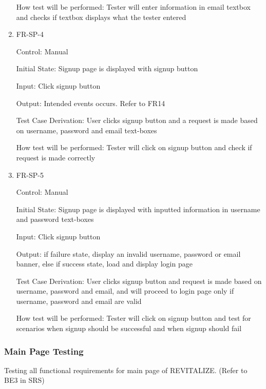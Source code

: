 \documentclass[12pt, titlepage]{article}
\begin{document}
\begin{enumerate}
How test will be performed: Tester will enter information in email textbox and checks if textbox displays what the tester entered

\item{FR-SP-4\\}

Control: Manual
					
Initial State: Signup page is displayed with signup button
					
Input: Click signup button
					
Output: Intended events occurs. Refer to FR14

Test Case Derivation: User clicks signup button and a request is made based on username, password and email text-boxes

How test will be performed: Tester will click on signup button and check if request is made correctly

\item{FR-SP-5\\}

Control: Manual
					
Initial State: Signup page is displayed with inputted information in username and password text-boxes
					
Input: Click signup button
					
Output: if failure state, display an invalid username, password or email banner, else if success state, load and display login page

Test Case Derivation: User clicks signup button and request is made based on username, password and email, and will proceed to login page only if username, password and email are valid

How test will be performed: Tester will click on signup button and test for scenarios when signup should be successful and when signup should fail


\end{enumerate}

\subsubsection{Main Page Testing}

Testing all functional requirements for main page of REVITALIZE. (Refer to BE3 in SRS)
\end{document}

